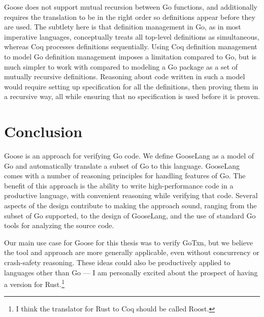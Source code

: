 Goose does not support mutual recursion between Go functions, and
additionally requires the translation to be in the right order so
definitions appear before they are used. The subtlety here is that
definition management in Go, as in most imperative languages,
conceptually treats all top-level definitions as simultaneous, whereas
Coq processes definitions sequentially. Using Coq definition management
to model Go definition management imposes a limitation compared to Go,
but is much simpler to work with compared to modeling a Go package as a
set of mutually recursive definitions. Reasoning about code written in such a
model would require setting up specification for all the definitions, then
proving them in a recursive way, all while ensuring that no specification is
used before it is proven.

\section{Conclusion}

Goose is an approach for verifying Go code. We define GooseLang as a model of Go
and automatically translate a subset of Go to this language. GooseLang comes
with a number of reasoning principles for handling features of Go. The benefit
of this approach is the ability to write high-performance code in a
productive language, with convenient reasoning while verifying
that code. Several aspects of the design contribute to making the approach
sound, ranging from the subset of Go supported, to the design of GooseLang, and
the use of standard Go tools for analyzing the source code.

Our main use case for Goose for this thesis was to verify GoTxn, but we believe
the tool and approach are more generally applicable, even without concurrency or
crash-safety reasoning. These ideas could also be productively applied to
languages other than Go --- I am personally excited about the prospect of having
a version for Rust.\footnote{I think the translator for Rust to Coq should be
called Roost.}
